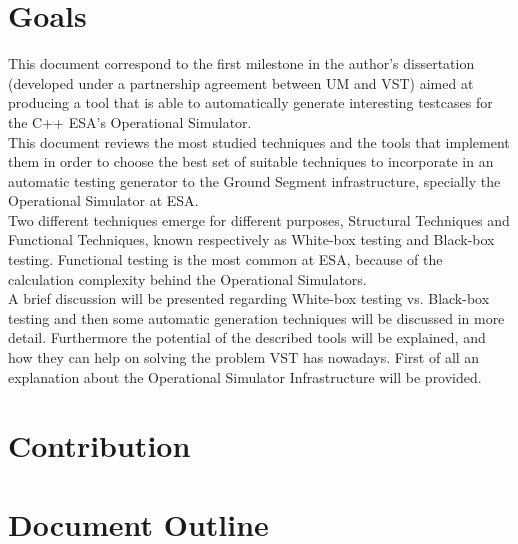 \section{Goals}
This document correspond to the first milestone in the author's dissertation (developed under a partnership agreement between \ac{UM} and \ac{VST}) aimed at producing a tool
that is able to automatically generate interesting testcases for the C++ \ac{ESA}'s Operational Simulator.\\
This document reviews the most studied techniques
and the tools that implement them in order to choose the best set of
suitable techniques to incorporate in an automatic
testing generator to the Ground Segment infrastructure, specially the
Operational Simulator at \ac{ESA}.\\
Two different techniques emerge for different purposes, Structural
Techniques and Functional Techniques,
known respectively as White-box\cite{stt} testing and Black-box\cite{black} testing.
Functional testing is the most common at \ac{ESA}, because of the
calculation complexity behind the Operational Simulators.\\
A brief discussion will be presented regarding White-box testing vs. Black-box
testing and then some automatic generation techniques will be discussed in more detail.
Furthermore the potential of the described tools will be explained, and how they can help
on solving the problem \ac{VST} has nowadays. First of all an explanation about the Operational Simulator Infrastructure will be provided.

\section{Contribution}
\section{Document Outline}
